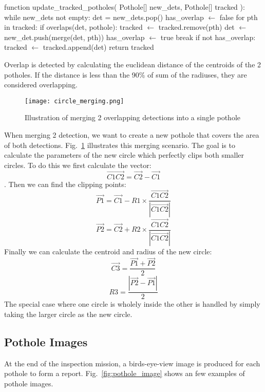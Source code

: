 \documentclass[conference]{IEEEtran}
\begin{document}
\begin{algorithm}[caption={Merge New Detection with Tracked Potholes}, label={alg1}]
function update_tracked_potholes(
    Pothole[] new_dets,
    Pothole[] tracked
):
    while new_dets not empty:
        det = new_dets.pop()
        has_overlap $\gets$ false
        for pth in tracked:
            if overlaps(det, pothole):
                tracked $\gets$ tracked.remove(pth)
                det $\gets$ new_det.push(merge(det, pth))
                has_overlap $\gets$ true
                break
        if not has_overlap:
            tracked $\gets$ tracked.append(det)
    return tracked
\end{algorithm}

Overlap is detected by calculating the euclidean distance of the centroids of the 2 potholes. If the distance is less than the 90\% of sum of the radiuses, they are considered overlapping.

\begin{figure}[ht]
    \centering
    \texttt{[image: circle\_merging.png]}
    \caption{Illustration of merging 2 overlapping detections into a single pothole}
    \label{fig:merging}
\end{figure}

When merging 2 detection, we want to create a new pothole that covers the area of both detections. Fig.~\ref{fig:merging} illustrates this merging scenario. The goal is to calculate the parameters of the new circle which perfectly clips both smaller circles. To do this we first calculate the vector:
 \[\overrightarrow{C1C2} = \overrightarrow{C2} - \overrightarrow{C1}\].
Then we can find the clipping points:
\[\overrightarrow{P1} = \overrightarrow{C1} -  R1 \times \frac{\overrightarrow{C1C2}}{|\overrightarrow{C1C2}|}\]
\[\overrightarrow{P2} = \overrightarrow{C2} + R2 \times \frac{\overrightarrow{C1C2}}{|\overrightarrow{C1C2}|}\]
Finally we can calculate the centroid and radius of the new circle:
\[\overrightarrow{C3} = \frac{\overrightarrow{P1} + \overrightarrow{P2}}{2}\]
\[R3 = \frac{|\overrightarrow{P2} - \overrightarrow{P1}|}{2}\]
The special case where one circle is wholely inside the other is handled by simply taking the larger circle as the new circle.

\subsection{Pothole Images}

At the end of the inspection mission, a birds-eye-view image is produced for each pothole to form a report. Fig.~\ref{fig:pothole_image} shows an few examples of pothole images.
\end{document}

